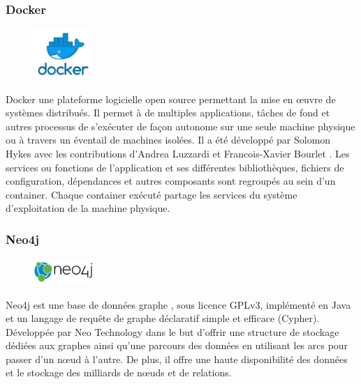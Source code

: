 \subsubsection*{Docker}
\begin{figure}
	\vspace{-60pt}
	\begin{center}
		\includegraphics[width=0.2\textwidth]{img/docker}
	\end{center} 
	\vspace{-20pt}
	\vspace{-10pt} 
\end{figure}
Docker une plateforme logicielle open source permettant la mise en œuvre de systèmes distribués. Il permet à de multiples applications, tâches de fond et autres processus de s'exécuter de façon autonome sur une seule machine physique ou à travers un éventail de machines isolées. Il a été développé par Solomon Hykes avec les contributions d'Andrea Luzzardi et Francois-Xavier Bourlet  \citep{docker}. Les services ou fonctions de l’application et ses différentes bibliothèques, fichiers de configuration, dépendances et autres composants sont regroupés au sein d'un container. Chaque container exécuté partage les services du système  d’exploitation de la machine physique.

\subsubsection*{Neo4j}
\begin{figure}
	\vspace{-20pt}
	\begin{center}
		\includegraphics[width=0.2\textwidth]{img/neo4j-logo-2015}
	\end{center} 
	\vspace{-20pt}
	\vspace{-10pt} 
\end{figure}
Neo4j est une base de données graphe \citep{neo4j}, sous licence GPLv3, implémenté en Java et un langage de requête de graphe déclaratif simple et efficace (Cypher). Développée par Neo Technology dans le but d'offrir une structure de stockage dédiées aux  graphes ainsi qu'une parcours des données en utilisant les arcs pour passer d'un nœud à l'autre. De plus, il offre une haute disponibilité des données et le stockage des milliards de nœuds et de relations.			

